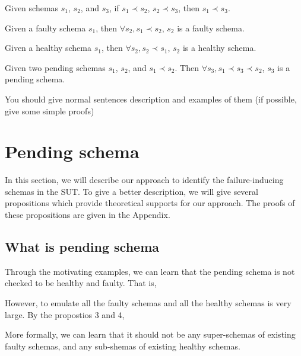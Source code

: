 \begin{proposition}\label{pro:subsumetrans}
Given schemas $s_{1}$, $s_{2}$, and $s_{3}$, if $s_{1} \prec s_{2}$, $s_{2} \prec s_{3}$, then $s_{1} \prec s_{3}$.
\end{proposition}




\begin{proposition}\label{pro:superoffaulty}
Given a faulty schema $s_{1}$, then $\forall s_{2}, s_{1} \prec s_{2}$, $s_{2}$ is a faulty schema.
\end{proposition}


\begin{proposition}\label{pro:subofhealthy}
Given a healthy schema $s_{1}$, then $\forall s_{2}, s_{2} \prec s_{1}$, $s_{2}$ is a healthy schema.
\end{proposition}


\begin{proposition}\label{pro:pending}
Given two pending schemas $s_{1}$, $s_{2}$, and $s_{1} \prec s_{2}$. Then $\forall s_{3}, s_{1} \prec s_{3} \prec s_{2}$, $s_{3}$ is a pending schema.
\end{proposition}


You should give normal sentences description and examples of them (if possible, give some simple proofs)

\section{Pending schema}\label{sec:app}
In this section, we will describe our approach to identify the failure-inducing schemas in the SUT. To give a better description, we will give several propositions which provide theoretical supports for our approach. The proofs of these propositions are given in the Appendix.

\subsection{What is pending schema}
Through the motivating examples, we can learn that the pending schema is not checked to be healthy and faulty. That is,

However, to emulate all the faulty schemas and all the healthy schemas is very large. By the propostios 3 and 4,

More formally, we can learn that it should not be any super-schemas of existing faulty schemas, and any sub-shemas of existing healthy schemas.


